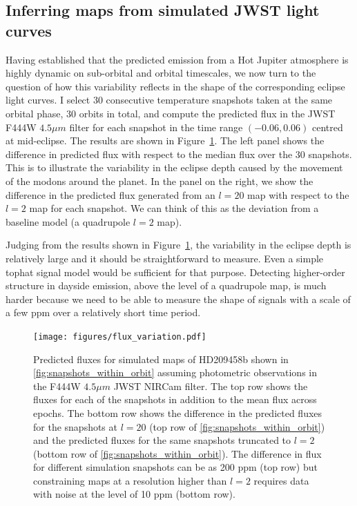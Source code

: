 \documentclass[12pt,dvipsnames]{report}
\begin{document}
\subsection{Inferring maps from simulated JWST light curves}

Having established that the predicted emission from a Hot Jupiter atmosphere is highly 
dynamic on sub-orbital and orbital timescales, we now turn to the question of how this variability
reflects in the shape of the corresponding eclipse light curves. 
I select 30 consecutive temperature  snapshots taken at the same orbital phase, 30 orbits in 
total, and compute the predicted 
flux in the JWST F444W $4.5\mu m$ filter for each snapshot in the time range 
$(-0.06,0.06)$ centred at mid-eclipse. The results are shown in 
Figure~\ref{fig:flux_variation}. The left panel shows the difference
in predicted flux with respect to the median flux over the 30 snapshots. This is to 
illustrate the variability in the eclipse depth caused by the movement of the modons 
around the planet. In the panel on the right, we show the difference in the predicted 
flux generated from an $l=20$ map with respect to the $l=2$ map for each snapshot.
We can think of this as the deviation from a baseline model (a quadrupole $l=2$ map).

Judging from the results shown in Figure~\ref{fig:flux_variation}, the variability in 
the eclipse depth is relatively large and it should be straightforward to measure.
Even a simple tophat signal model would be sufficient for that purpose.
Detecting higher-order structure in dayside emission, above the level of a 
quadrupole map, is much harder because we need to be able to measure the shape of signals 
with a scale of a few ppm over a relatively short time period. 

\begin{figure}[t!]
    \begin{centering}
        \texttt{[image: figures/flux\_variation.pdf]}
        \caption{
            Predicted fluxes for simulated maps of HD209458b shown in \ref{fig:snapshots_within_orbit} assuming photometric observations
            in the F444W $4.5\mu m$ JWST NIRCam filter.
            The top row shows the fluxes for each of the snapshots in addition to the mean flux across epochs.
            The bottom row shows the difference in the predicted fluxes for the snapshots at $l=20$ (top row of
            \ref{fig:snapshots_within_orbit}) and the predicted fluxes for the same snapshots truncated to $l=2$ (bottom row of
            \ref{fig:snapshots_within_orbit}).
            The difference in flux for different simulation snapshots can be as 200 ppm (top row) but constraining maps
            at a resolution higher than $l=2$ requires data with noise at the level of 10 ppm (bottom row).
        }
        \label{fig:flux_variation}
    \end{centering}
\end{figure}
\end{document}
